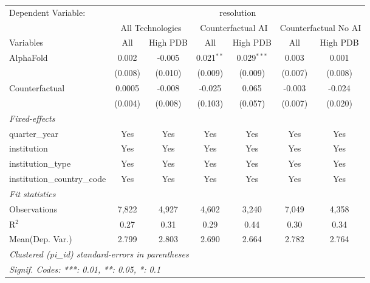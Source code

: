 \begingroup
\centering
\begin{tabular}{lcccccc}
   \tabularnewline \midrule \midrule
   Dependent Variable: & \multicolumn{6}{c}{resolution}\\
 & \multicolumn{2}{c}{All Technologies} & \multicolumn{2}{c}{Counterfactual AI} & \multicolumn{2}{c}{Counterfactual No AI} \\
\cmidrule(lr){1-1}\cmidrule(lr){2-3} \cmidrule(lr){4-5} \cmidrule(lr){6-7}
Variables & \multicolumn{1}{c}{All} & \multicolumn{1}{c}{High PDB} & \multicolumn{1}{c}{All} & \multicolumn{1}{c}{High PDB} & \multicolumn{1}{c}{All} & \multicolumn{1}{c}{High PDB} \\
\cmidrule(lr){1-1}\cmidrule(lr){2-2} \cmidrule(lr){3-3} \cmidrule(lr){4-4} \cmidrule(lr){5-5} \cmidrule(lr){6-6} \cmidrule(lr){7-7}
   AlphaFold                    & 0.002   & -0.005  & 0.021$^{**}$ & 0.029$^{***}$ & 0.003   & 0.001\\   
                                & (0.008) & (0.010) & (0.009)      & (0.009)       & (0.007) & (0.008)\\   
   Counterfactual               & 0.0005  & -0.008  & -0.025       & 0.065         & -0.003  & -0.024\\   
                                & (0.004) & (0.008) & (0.103)      & (0.057)       & (0.007) & (0.020)\\   
   \midrule
   \emph{Fixed-effects}\\
   quarter\_year                & Yes     & Yes     & Yes          & Yes           & Yes     & Yes\\  
   institution                  & Yes     & Yes     & Yes          & Yes           & Yes     & Yes\\  
   institution\_type            & Yes     & Yes     & Yes          & Yes           & Yes     & Yes\\  
   institution\_country\_code   & Yes     & Yes     & Yes          & Yes           & Yes     & Yes\\  
   \midrule
   \emph{Fit statistics}\\
   Observations                 & 7,822   & 4,927   & 4,602        & 3,240         & 7,049   & 4,358\\  
   R$^2$                        & 0.27    & 0.31    & 0.29         & 0.44          & 0.30    & 0.34\\  
Mean(Dep. Var.) & 2.799 & 2.803 & 2.690 & 2.664 & 2.782 & 2.764 \\
   \midrule \midrule
   \multicolumn{7}{l}{\emph{Clustered (pi\_id) standard-errors in parentheses}}\\
   \multicolumn{7}{l}{\emph{Signif. Codes: ***: 0.01, **: 0.05, *: 0.1}}\\
\end{tabular}
\par\endgroup
